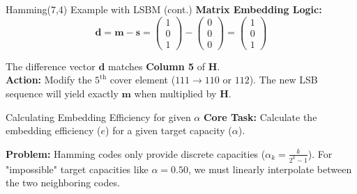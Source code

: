 \documentclass{beamer}
\begin{document}
\begin{frame}{Hamming(7,4) Example with LSBM (cont.)}
    \textbf{Matrix Embedding Logic:}
    \begin{equation*}
        \mathbf{d} = \mathbf{m} - \mathbf{s} = \begin{pmatrix} 1 \\ 0 \\ 1 \end{pmatrix} - \begin{pmatrix} 0 \\ 0 \\ 0 \end{pmatrix} = \begin{pmatrix} 1 \\ 0 \\ 1 \end{pmatrix}
    \end{equation*}
    
    The difference vector $\mathbf{d}$ matches \textbf{Column 5} of $\mathbf{H}$. \\
    \vspace{0.5em}
    \textbf{Action:} Modify the $5^{\text{th}}$ cover element ($111 \rightarrow 110$ or $112$). The new LSB sequence will yield exactly $\mathbf{m}$ when multiplied by $\mathbf{H}$.
\end{frame}
\begin{frame}{Calculating Embedding Efficiency for given $\alpha$}
    \textbf{Core Task:} Calculate the embedding efficiency ($e$) for a given target capacity ($\alpha$).
    \vspace{0.5em}

    \textbf{Problem:} Hamming codes only provide discrete capacities ($\alpha_k = \frac{k}{2^k - 1}$). 
    For "impossible" target capacities like $\alpha = 0.50$, we must linearly interpolate between the two neighboring codes.
    \vspace{0.5em}
\end{frame}
\end{document}
